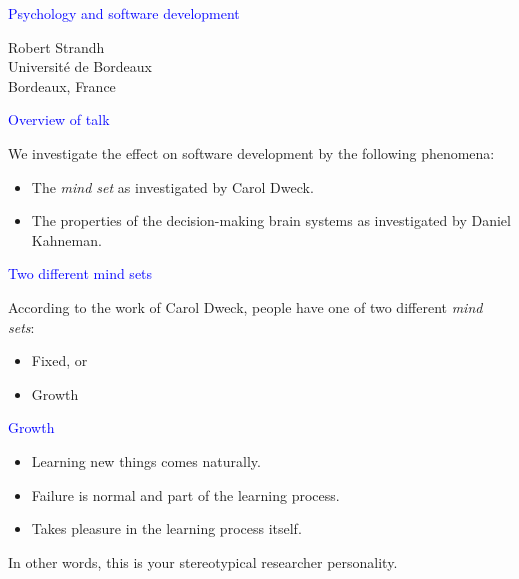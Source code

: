 \documentclass{slides}
\newcommand{\ti}[1]{\begin{center}\Large{\textcolor{blue}{#1}}\end{center}}
\begin{document}
\landscape
\setlength{\oddsidemargin}{1cm}
\setlength{\evensidemargin}{1cm}
\setlength{\marginparwidth}{1cm}
\setlength{\parskip}{0.5cm}
\setlength{\parindent}{0cm}
\begin{slide}\ti{Psychology and software development}
\vskip 0.5cm
\begin{center}
Robert Strandh \\
Université de Bordeaux \\
Bordeaux, France
\end{center}
\vfill\end{slide}
\begin{slide}\ti{Overview of talk}

We investigate the effect on software development by the following
phenomena:

  \begin{itemize}
  \item The \emph{mind set} as investigated by Carol Dweck.
  \item The properties of the decision-making brain systems as
    investigated by Daniel Kahneman.
  \end{itemize}

\vfill\end{slide}
\begin{slide}\ti{Two different mind sets}

According to the work of Carol Dweck, people have one of two different
\emph{mind sets}:

\begin{itemize}
\item Fixed, or
\item Growth
\end{itemize}

\vfill\end{slide}
\begin{slide}\ti{Growth}

  \begin{itemize}
  \item Learning new things comes naturally.
  \item Failure is normal and part of the learning process.
  \item Takes pleasure in the learning process itself.
  \end{itemize}

In other words, this is your stereotypical researcher personality.

\vfill\end{slide}
\end{document}
